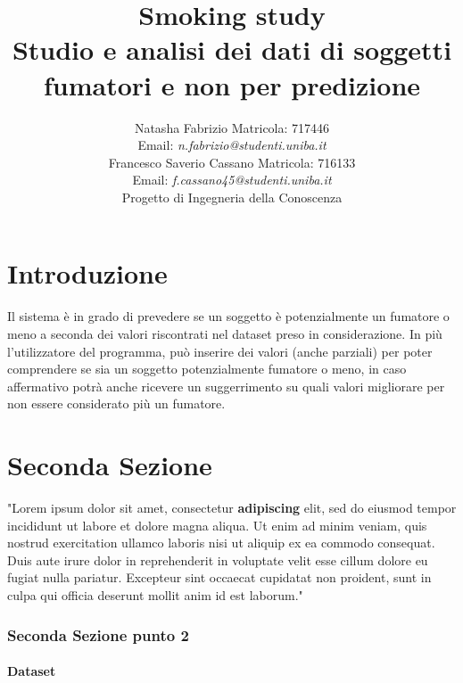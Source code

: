 \documentclass{article}
\title{Smoking study \\ 
    \large Studio e analisi dei dati di soggetti fumatori e non per predizione}
\author{Natasha Fabrizio Matricola: 717446 \\
Email: \textit{n.fabrizio@studenti.uniba.it} \\
        Francesco Saverio Cassano Matricola: 716133 \\
        Email: \textit{f.cassano45@studenti.uniba.it} \\
    Progetto di Ingegneria della Conoscenza}
\date{}
\begin{document}
    \maketitle

    \newpage

    \tableofcontents{}

    \newpage



\section{Introduzione}

Il sistema è in grado di prevedere se un soggetto è potenzialmente un fumatore o meno a seconda dei valori riscontrati nel dataset preso in considerazione. In più l'utilizzatore del programma, può inserire dei valori (anche parziali) per poter comprendere se sia un soggetto potenzialmente fumatore o meno, in caso affermativo potrà anche ricevere un suggerrimento su quali valori migliorare per non essere considerato più un fumatore.

\section{Seconda Sezione}

"Lorem ipsum dolor sit amet, consectetur \textbf{adipiscing} elit, sed do eiusmod tempor incididunt ut labore et dolore magna aliqua. Ut enim ad minim veniam, quis nostrud exercitation ullamco laboris nisi ut aliquip ex ea commodo consequat. Duis aute irure dolor in reprehenderit in voluptate velit esse cillum dolore eu fugiat nulla pariatur. Excepteur sint occaecat cupidatat non proident, sunt in culpa qui officia deserunt mollit anim id est laborum."

\subsubsection{Seconda Sezione punto 2}
\paragraph{Dataset}
\end{document}
